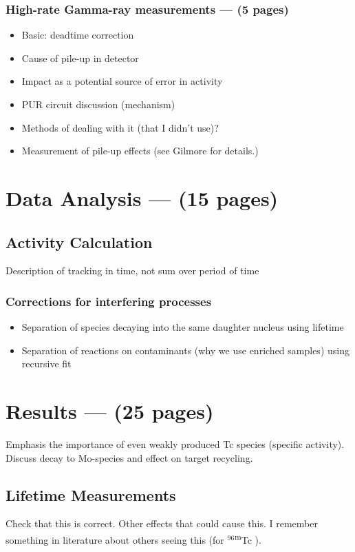 \documentclass[final,3p,times,twocolumn,authoryear]{elsarticle_modified}
\newcommand{\mnuc}[2]{ {\normalfont $^{#1}$\textsuperscript{m}#2} }
\begin{document}
\subsubsection{High-rate Gamma-ray measurements --- (5 pages)}
	\begin{itemize}
	\itemsep-0.2em 
		\item Basic: deadtime correction
		\item Cause of pile-up in detector
		\item Impact as a potential source of error in activity
		\item PUR circuit discussion (mechanism)
		\item Methods of dealing with it (that I didn't use)?
		\item Measurement of pile-up effects (see Gilmore for details.)
	\end{itemize}

\section{Data Analysis --- (15 pages)}
\label{Analysis}

\subsection{Activity Calculation}
\label{Activity} 
Description of tracking in time, not sum over period of time
\subsubsection{Corrections for interfering processes}
\label{Interfering}
  \begin{itemize}
  \itemsep-0.5em 
   	\item Separation of species decaying into the same daughter nucleus using lifetime
  	\item Separation of reactions on contaminants (why we use enriched samples) using recursive fit
  \end{itemize}

\section{Results --- (25 pages)}
\label{Results}
Emphasis the importance of even weakly produced Tc species (specific activity). Discuss decay to Mo-species and effect on target recycling. 
\subsection{Lifetime Measurements}
\label{Lifetime}
Check that this is correct. Other effects that could cause this. I remember something in literature about others seeing this (for \mnuc{96}{Tc}).
\end{document}
